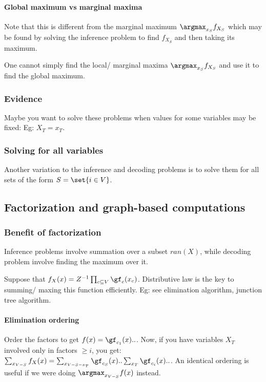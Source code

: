 \documentclass[oneside, article]{memoir}
\begin{document}
\paragraph{Global maximum vs marginal maxima}
Note that this is different from the marginal maximum $\argmax_{x_S} f_{X_{S}}$ which may be found by solving the inference problem to find $f_{X_S}$ and then taking its maximum.

One cannot simply find the local/ marginal maxima $\argmax_{x_S} f_{X_{S}}$ and use it to find the global maximum.

\subsubsection{Evidence}
Maybe you want to solve these problems when values for some variables may be fixed: Eg: $X_T = x_T$.

\subsubsection{Solving for all variables}
Another variation to the inference and decoding problems is to solve them for all sets of the form $S = \set{i \in V}$.

\subsection{Factorization and graph-based computations}
\subsubsection{Benefit of factorization}
Inference problems involve summation over a subset $ran(X)$, while decoding problem involve finding the maximum over it.

Suppose that $f_X(x) = Z^{-1}\prod_{c \subseteq V} \gf_{c}(x_c)$. Distributive law is the key to summing/ maxing this function efficiently. Eg: see elimination algorithm, junction tree algorithm.

\paragraph*{Elimination ordering}
Order the factors to get $f(x) = \gf_{c_1}(x) .. $. Now, if you have variables $X_{T}$ involved only in factors $\geq i$, you get: $\sum_{x_{V-S}} f_X(x) = \sum_{x_{V-S - x_{T}}}\gf_{c_S}(x) .. \sum_{x_{T}}\gf_{c_i}(x)..$. An identical ordering is useful if we were doing $\argmax_{x_{V-S}} f(x)$ instead. 
\end{document}
